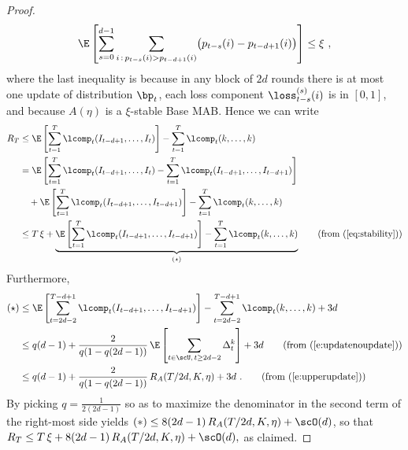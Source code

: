 \begin{proof}
\begin{align}
\label{eq:stability} 
    \E\left[ \sum_{s=0}^{d-1} \sum_{i\,:\,p_{t-s}(i) > p_{t-d+1}(i)} \bigl(p_{t-s}(i) - p_{t-d+1}(i)\bigr) \right]
\le
    \xi~,
\end{align}
%
where the last inequality is because in any block of $2d$ rounds there is
at most one update of distribution $\bp_t$, each loss component $\loss_{t-s}^{(s)}(i)$ is in $[0,1]$, and because $A(\eta)$ is a $\xi$-stable 
Base MAB.
Hence we can write
\begin{align*}
	R_T
&\le
	\E\left[\sum_{t=1}^T \lcomp_t(I_{t-d+1},\dots,I_t)\right] - \sum_{t=1}^T \lcomp_t(k,\dots,k)
\\&=
	\E\left[\sum_{t=1}^T \lcomp_t(I_{t-d+1},\dots,I_t) - \sum_{t=1}^T \lcomp_t(I_{t-d+1},\dots,I_{t-d+1})\right]
\\&
	\quad + \E\left[\sum_{t=1}^T \lcomp_t(I_{t-d+1},\dots,I_{t-d+1})\right] - \sum_{t=1}^T \lcomp_t(k,\dots,k)
\\&\le
	T\,\xi + \underbrace{\E\left[\sum_{t=1}^T \lcomp_t(I_{t-d+1},\dots,I_{t-d+1})\right] - \sum_{t=1}^T \lcomp_t(k,\dots,k)}_{(\star)}
	\tag{from~(\ref{eq:stability})}
\end{align*}
%
Furthermore,
%
\begin{align*}
	(\star)
&\leq
	\E\left[\sum_{t=2d-2}^{T-d+1} \lcomp_t(I_{t-d+1},\dots,I_{t-d+1})\right] - \sum_{t=2d-2}^{T-d+1} \lcomp_t(k,\dots,k) + 3d
\\&\leq
	q(d-1) + \frac{2}{q(1-q(2d-1))}\,\E\left[\sum_{t\in \scU,\,t\geq 2d-2} \Delta_t^k \right] + 3d
\tag{from~(\ref{e:updatenoupdate})}
\\&\leq
	q(d-1) + \frac{2}{q(1-q(2d-1))}\,R_A(T/2d,K,\eta) + 3d~.
\tag{from~(\ref{e:upperupdate})}
\end{align*}
%
By picking $q = \tfrac{1}{2(2d-1)}$ so as to maximize the denominator in the second term of the right-most side yields
$
(*) \leq 8(2d-1)\,R_A(T/2d,K,\eta) + \scO(d)
$, 
so that
$
R_T \leq T\,\xi + 8(2d-1)\,R_A(T/2d,K,\eta) + \scO(d),
$
as claimed.
\end{proof}




